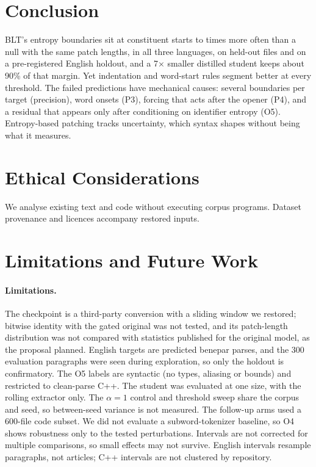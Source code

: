 \section{Conclusion}
BLT's entropy boundaries sit at constituent starts \xRatioEn{} to \xRatioPy{} times more often than a null with the same patch lengths, in all three languages, on held-out files and on a pre-registered English holdout, and a 7$\times$ smaller distilled student keeps about 90\% of that margin. Yet indentation and word-start rules segment better at every threshold. The failed predictions have mechanical causes: several boundaries per target (precision), word onsets (P3), forcing that acts after the opener (P4), and a residual that appears only after conditioning on identifier entropy (O5). Entropy-based patching tracks uncertainty, which syntax shapes without being what it measures.

\section*{Ethical Considerations}
We analyse existing text and code without executing corpus programs. Dataset provenance and licences accompany restored inputs.

\section*{Limitations and Future Work}
\paragraph{Limitations.} The checkpoint is a third-party conversion with a sliding window we restored; bitwise identity with the gated original was not tested, and its patch-length distribution was not compared with statistics published for the original model, as the proposal planned. English targets are predicted benepar parses, and the 300 evaluation paragraphs were seen during exploration, so only the holdout is confirmatory. The O5 labels are syntactic (no types, aliasing or bounds) and restricted to clean-parse C++. The student was evaluated at one size, with the rolling extractor only. The $\alpha=1$ control and threshold sweep share the corpus and seed, so between-seed variance is not measured. The follow-up arms used a 600-file code subset. We did not evaluate a subword-tokenizer baseline, so O4 shows robustness only to the tested perturbations. Intervals are not corrected for multiple comparisons, so small effects may not survive. English intervals resample paragraphs, not articles; C++ intervals are not clustered by repository.
